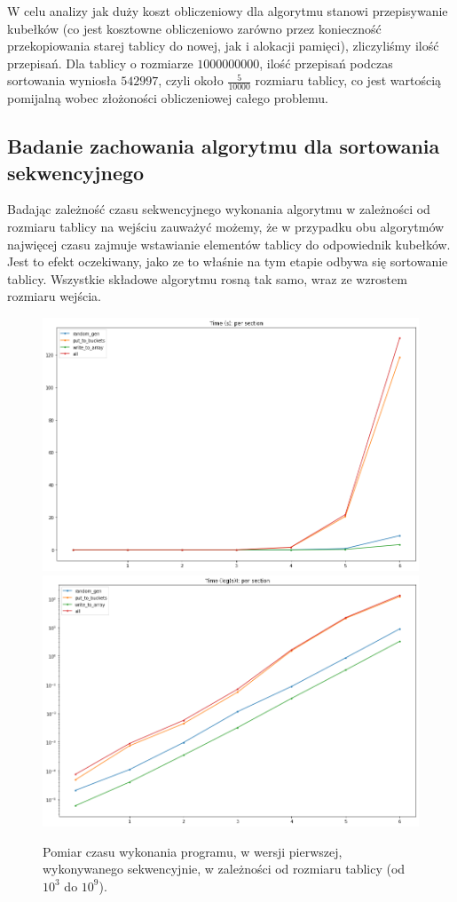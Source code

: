 \documentclass{article}
\begin{document}
    W celu analizy jak duży koszt obliczeniowy dla algorytmu stanowi przepisywanie kubełków (co jest kosztowne obliczeniowo zarówno przez konieczność przekopiowania starej tablicy do nowej, jak i alokacji pamięci), zliczyliśmy ilość przepisań. Dla tablicy o rozmiarze $1000 000 000$, ilość przepisań podczas sortowania wyniosła $542 997$, czyli około $\frac{5}{10000}$ rozmiaru tablicy, co jest wartością pomijalną wobec złożoności obliczeniowej całego problemu.
    
    \subsection{Badanie zachowania algorytmu dla sortowania sekwencyjnego}
    Badając zależność czasu sekwencyjnego wykonania algorytmu w zależności od rozmiaru tablicy na wejściu zauważyć możemy, że w przypadku obu algorytmów najwięcej czasu zajmuje wstawianie elementów tablicy do odpowiednik kubełków. Jest to efekt oczekiwany, jako ze to właśnie na tym etapie odbywa się sortowanie tablicy. Wszystkie składowe algorytmu rosną tak samo, wraz ze wzrostem rozmiaru wejścia. 
        \newpage
        \begin{figure}[h!]
            \centering
            \includegraphics[width=17cm]{report2/images/Sequential/sam_time.png}
            \includegraphics[width=17cm]{report2/images/Sequential/sam_time_log.png}
            \caption{Pomiar czasu wykonania programu, w wersji pierwszej, wykonywanego sekwencyjnie, w zależności od rozmiaru tablicy (od ${10^{3}}$ do ${10^{9}}$). }
        \end{figure}
\end{document}
